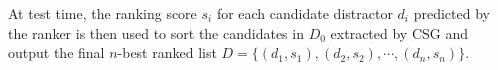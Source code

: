 
At test time, the ranking score $s_i$ for each candidate distractor $d_i$ 
predicted by the ranker is then used to sort the candidates in 
$D_0$ extracted by CSG and output the final $n$-best ranked list 
$D = \{(d_1, s_1), (d_2, s_2), \cdots, (d_n, s_n) \}$.
